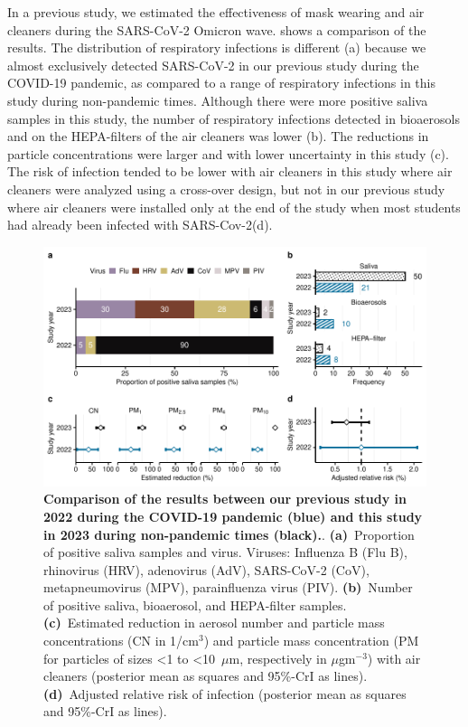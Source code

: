 \documentclass[fleqn,11pt]{wlscirep}
\begin{document}
In a previous study\cite{Banholzer2023PLoSMed}, we estimated the effectiveness of mask wearing and air cleaners during the SARS-CoV-2 Omicron wave.  shows a comparison of the results. The distribution of respiratory infections is different (a) because we almost exclusively detected SARS-CoV-2 in our previous study during the COVID-19 pandemic, as compared to a range of respiratory infections in this study during non-pandemic times. Although there were more positive saliva samples in this study, the number of respiratory infections detected in bioaerosols and on the HEPA-filters of the air cleaners was lower (b).
The reductions in particle concentrations were larger and with lower uncertainty in this study (c). The risk of infection tended to be lower with air cleaners in this study where air cleaners were analyzed using a cross-over design, but not in our previous study where air cleaners were installed only at the end of the study when most students had already been infected with SARS-Cov-2(d).

\begin{figure}[!htpb]
    \includegraphics[width=\linewidth]{../../results/comparison.pdf} 
    \caption{\textbf{Comparison of the results between our previous study in 2022 during the COVID-19 pandemic (blue) and this study in 2023 during non-pandemic times (black).}. \textbf{(a)}~Proportion of positive saliva samples and virus. Viruses: Influenza B (Flu B), rhinovirus (HRV), adenovirus (AdV), SARS-CoV-2 (CoV), metapneumovirus (MPV), parainfluenza virus (PIV). \textbf{(b)}~Number of positive saliva, bioaerosol, and HEPA-filter samples. \textbf{(c)}~Estimated reduction in aerosol number and particle mass concentrations (CN in 1/cm$^3$) and particle mass concentration (PM for particles of sizes <1 to <10~$\mu$m, respectively in $\mu$gm$^{-3}$) with air cleaners (posterior mean as squares and 95\%-CrI as lines). \textbf{(d)}~Adjusted relative risk of infection (posterior mean as squares and 95\%-CrI as lines).}
    \label{fig:comparison}
\end{figure}
\end{document}
